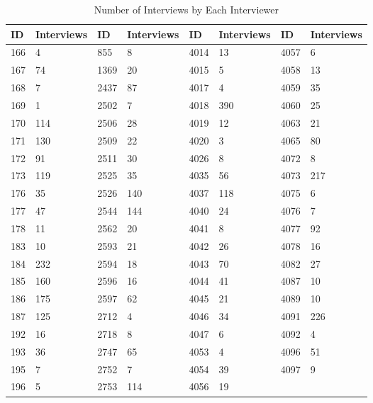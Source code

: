 \begin{table}[H] \caption{Number of Interviews by Each Interviewer} \label{tab:num-interview}
\begin{tabular}{ll|ll|ll|ll}
\toprule
ID	&	Interviews	&	ID	&	Interviews	&	ID	&	Interviews	&	ID	&	Interviews	\\	\midrule
166	&	4	&	855	&	8	&	4014	&	13	&	4057	&	6	\\	
167	&	74	&	1369	&	20	&	4015	&	5	&	4058	&	13	\\	
168	&	7	&	2437	&	87	&	4017	&	4	&	4059	&	35	\\	
169	&	1	&	2502	&	7	&	4018	&	390	&	4060	&	25	\\	
170	&	114	&	2506	&	28	&	4019	&	12	&	4063	&	21	\\	
171	&	130	&	2509	&	22	&	4020	&	3	&	4065	&	80	\\	
172	&	91	&	2511	&	30	&	4026	&	8	&	4072	&	8	\\	
173	&	119	&	2525	&	35	&	4035	&	56	&	4073	&	217	\\	
176	&	35	&	2526	&	140	&	4037	&	118	&	4075	&	6	\\	
177	&	47	&	2544	&	144	&	4040	&	24	&	4076	&	7	\\	
178	&	11	&	2562	&	20	&	4041	&	8	&	4077	&	92	\\	
183	&	10	&	2593	&	21	&	4042	&	26	&	4078	&	16	\\	
184	&	232	&	2594	&	18	&	4043	&	70	&	4082	&	27	\\	
185	&	160	&	2596	&	16	&	4044	&	41	&	4087	&	10	\\	
186	&	175	&	2597	&	62	&	4045	&	21	&	4089	&	10	\\	
187	&	125	&	2712	&	4	&	4046	&	34	&	4091	&	226	\\	
192	&	16	&	2718	&	8	&	4047	&	6	&	4092	&	4	\\	
193	&	36	&	2747	&	65	&	4053	&	4	&	4096	&	51	\\	
195	&	7	&	2752	&	7	&	4054	&	39	&	4097	&	9	\\	
196	&	5	&	2753	&	114	&	4056	&	19	&		&		\\	\bottomrule
\end{tabular}

\end{table}

